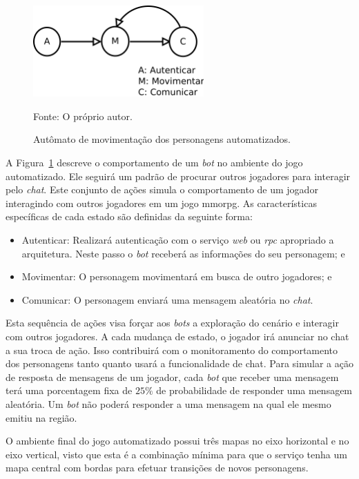 \begin{figure}[htb!]
  \caption{Autômato de movimentação dos personagens automatizados.}
  \label{fig:movimentacao}
  \includegraphics[height=3.5cm]{img/cap3/movimentacao.png}
  \centering

  Fonte: O próprio autor.
\end{figure}

A Figura~\ref{fig:movimentacao} descreve o comportamento de um \textit{bot} no ambiente do jogo automatizado.
%
Ele seguirá um padrão de procurar outros jogadores para interagir pelo \textit{chat}.
%
Este conjunto de ações simula o comportamento de um jogador interagindo com outros jogadores em um jogo \ac{mmorpg}.
%
As características específicas de cada estado são definidas da seguinte forma:

\begin{itemize}
  \item Autenticar: Realizará autenticação com o serviço \textit{web} ou \textit{rpc} apropriado a arquitetura. Neste passo o \textit{bot} receberá as informações do seu personagem; e
  \item Movimentar: O personagem movimentará em busca de outro jogadores; e
  \item Comunicar: O personagem enviará uma mensagem aleatória no \textit{chat}.
\end{itemize}

Esta sequência de ações visa forçar aos \textit{bots} a exploração do cenário e interagir com outros jogadores.
%
A cada mudança de estado, o jogador irá anunciar no chat a sua troca de ação.
%
Isso contribuirá com o monitoramento do comportamento dos personagens tanto quanto usará a funcionalidade de chat.
%
Para simular a ação de resposta de mensagens de um jogador, cada \textit{bot} que receber uma mensagem terá uma porcentagem fixa de $25\%$ de probabilidade de responder uma mensagem aleatória.
%
Um \textit{bot} não poderá responder a uma mensagem na qual ele mesmo emitiu na região.

O ambiente final do jogo automatizado possui três mapas no eixo horizontal e no eixo vertical, visto que esta é a combinação mínima para que o serviço tenha um mapa central com bordas para efetuar transições de novos personagens.

